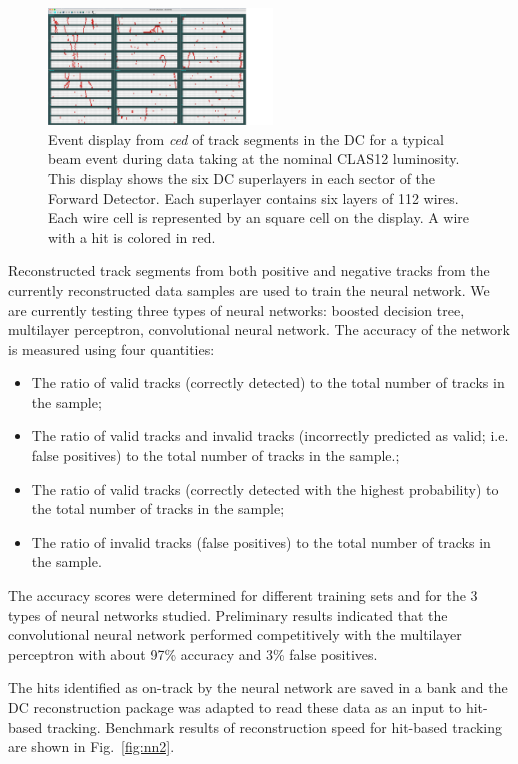\begin{figure}
\centering
\includegraphics[width=0.53\textwidth]{pics/nn1.png}
\caption{Event display from {\it ced} of track segments in the DC for a typical beam event during data taking
  at the nominal CLAS12 luminosity. This display shows the six DC superlayers in each sector of the Forward
  Detector. Each superlayer contains six layers of 112 wires. Each wire cell is represented by an square cell on the
  display. A wire with a hit is colored in red.}
\label{fig:nn1}
\end{figure}

Reconstructed track segments from both positive and negative tracks from the currently reconstructed data
samples are used to train the neural network. We are currently testing three types of neural networks: boosted
decision tree, multilayer perceptron, convolutional neural network. The accuracy of the network is measured using
four quantities:

\begin{itemize}
\item The ratio of valid tracks (correctly detected) to the total number of tracks in the sample;
\item The ratio of valid tracks and invalid tracks (incorrectly predicted as valid; i.e. false positives) to the
  total number of tracks in the sample.;
\item The ratio of valid tracks (correctly detected with the highest probability) to the total number of tracks in
  the sample;
\item The ratio of invalid tracks (false positives) to the total number of tracks in the sample.
\end{itemize}

The accuracy scores were determined for different training sets and for the 3 types of neural networks studied.
Preliminary results indicated that the convolutional neural network performed competitively with the multilayer
perceptron with about 97\% accuracy and 3\% false positives. 

The hits identified as on-track by the neural network are saved in a bank and the DC reconstruction package was
adapted to read these data as an input to hit-based tracking. Benchmark results of reconstruction speed for
hit-based tracking are shown in Fig.~\ref{fig:nn2}.

